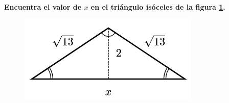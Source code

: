 \begin{multicols}{2}
    \textbf{Encuentra el valor de $x$ en el triángulo isóceles de la figura \ref{fig:pitagoras10}.}

\begin{figure}[H]
    \centering
    \includegraphics[width=0.55\linewidth]{../images/pitagoras10.png}
    \caption{}
    \label{fig:pitagoras10}
\end{figure}
\end{multicols}\vspace{-0.5cm}
